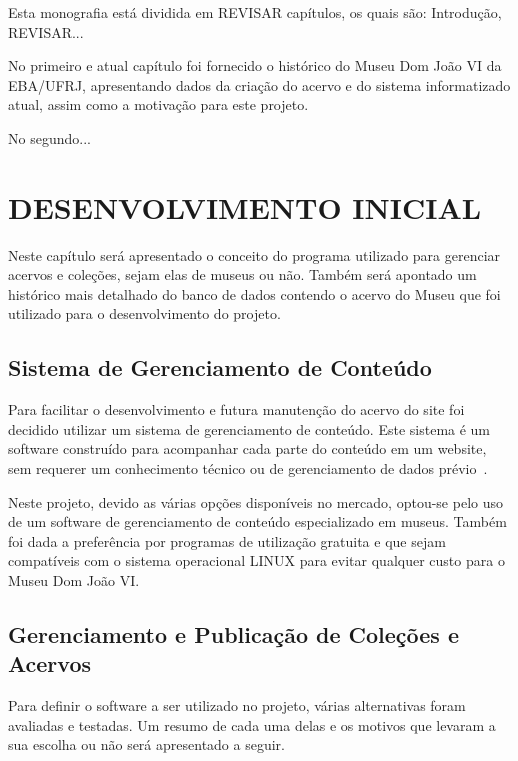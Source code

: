 \documentclass[a4paper,12pt,oneside,onecolumn,final,fleqn]{repUERJ}
\begin{document}
Esta monografia está dividida em REVISAR capítulos, os quais são: Introdução, REVISAR...

No primeiro e atual capítulo foi fornecido o histórico do Museu Dom João VI da EBA/UFRJ, apresentando dados da criação do acervo e do sistema informatizado atual, assim como a motivação para este projeto.

No segundo...


\chapter{DESENVOLVIMENTO INICIAL}

Neste capítulo será apresentado o conceito do programa utilizado para gerenciar acervos e coleções, sejam elas de museus ou não. Também será apontado um histórico mais detalhado do banco de dados contendo o acervo do Museu que foi utilizado para o desenvolvimento do projeto.




\section{Sistema de Gerenciamento de Conteúdo}

Para facilitar o desenvolvimento e futura manutenção do acervo do site foi decidido utilizar um sistema de gerenciamento de conteúdo. Este sistema é um software construído para acompanhar cada parte do conteúdo em um website, sem requerer um conhecimento técnico ou de gerenciamento de dados prévio~\cite{CMS}.


Neste projeto, devido as várias opções disponíveis no mercado, optou-se pelo uso de um software de gerenciamento de conteúdo especializado em museus. Também foi dada a preferência por programas de utilização gratuita e que sejam compatíveis com o sistema operacional LINUX para evitar qualquer custo para o Museu Dom João VI.

\section{Gerenciamento e Publicação de Coleções e Acervos}


Para definir o software a ser utilizado no projeto, várias alternativas foram avaliadas e testadas. Um resumo de cada uma delas e os motivos que levaram a sua escolha ou não será apresentado a seguir.
\end{document}
